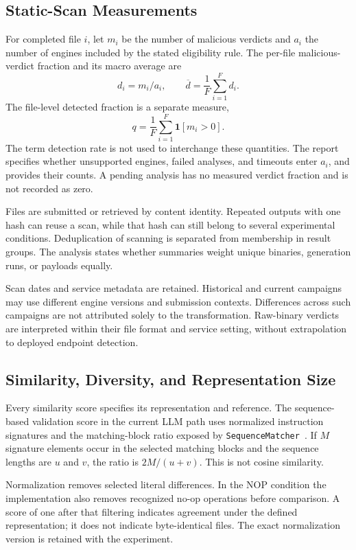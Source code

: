 \subsection{Static-Scan Measurements}
For completed file $i$, let $m_i$ be the number of malicious verdicts
and $a_i$ the number of engines included by the stated eligibility rule.
The per-file malicious-verdict fraction and its macro average are
\begin{equation}
d_i=m_i/a_i,\qquad
\overline d=\frac{1}{F}\sum_{i=1}^{F}d_i.
\end{equation}
The file-level detected fraction is a separate measure,
\begin{equation}
q=\frac{1}{F}\sum_{i=1}^{F}\mathbf{1}[m_i>0].
\end{equation}
The term detection rate is not used to interchange these quantities.
The report specifies whether unsupported engines, failed analyses,
and timeouts enter $a_i$, and provides their counts. A pending
analysis has no measured verdict fraction and is not recorded as zero.

Files are submitted or retrieved by content identity. Repeated outputs
with one hash can reuse a scan, while that hash can still belong to
several experimental conditions. Deduplication of scanning is separated
from membership in result groups. The analysis states whether summaries
weight unique binaries, generation runs, or payloads equally.

Scan dates and service metadata are retained. Historical and current
campaigns may use different engine versions and submission contexts.
Differences across such campaigns are not attributed solely to the
transformation. Raw-binary verdicts are interpreted within their file
format and service setting, without extrapolation to deployed endpoint
detection.

\subsection{Similarity, Diversity, and Representation Size}
Every similarity score specifies its representation and reference.
The sequence-based validation score in the current LLM path uses
normalized instruction signatures and the matching-block ratio exposed
by \texttt{SequenceMatcher}~\cite{python_difflib}. If $M$ signature
elements occur in the selected matching blocks and the sequence lengths
are $u$ and $v$, the ratio is $2M/(u+v)$. This is not cosine similarity.

Normalization removes selected literal differences. In the NOP
condition the implementation also removes recognized no-op operations
before comparison. A score of one after that filtering indicates
agreement under the defined representation; it does not indicate
byte-identical files. The exact normalization version is retained with
the experiment.

